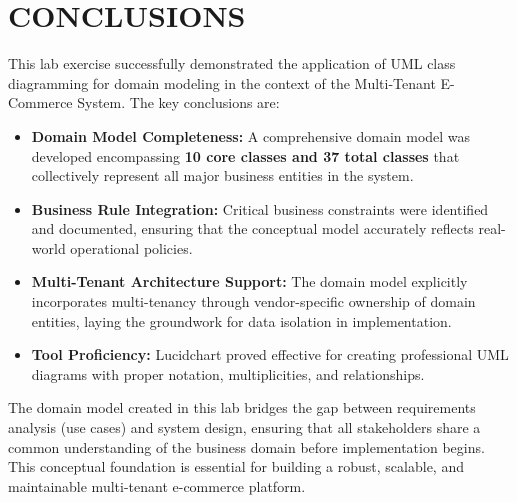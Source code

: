 \chapter{CONCLUSIONS}\label{ch:conclusion}

This lab exercise successfully demonstrated the application of UML class diagramming for domain modeling in the context of the Multi-Tenant E-Commerce System. The key conclusions are:

\begin{itemize}
    \item \textbf{Domain Model Completeness:} A comprehensive domain model was developed encompassing \textbf{10 core classes and 37 total classes} that collectively represent all major business entities in the system.
    
    \item \textbf{Business Rule Integration:} Critical business constraints were identified and documented, ensuring that the conceptual model accurately reflects real-world operational policies.
    
    \item \textbf{Multi-Tenant Architecture Support:} The domain model explicitly incorporates multi-tenancy through vendor-specific ownership of domain entities, laying the groundwork for data isolation in implementation.
    
    \item \textbf{Tool Proficiency:} Lucidchart proved effective for creating professional UML diagrams with proper notation, multiplicities, and relationships.
\end{itemize}

\noindent The domain model created in this lab bridges the gap between requirements analysis (use cases) and system design, ensuring that all stakeholders share a common understanding of the business domain before implementation begins. This conceptual foundation is essential for building a robust, scalable, and maintainable multi-tenant e-commerce platform.